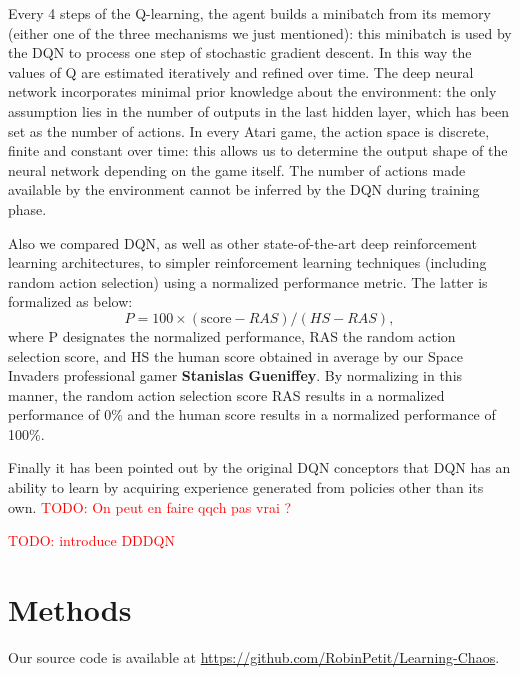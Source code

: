 \documentclass[letterpaper]{article}
\newcommand\todo[1]{\textcolor{red}{TODO: #1}}
\begin{document}
Every 4 steps of the Q-learning, the agent builds a minibatch from its memory (either one of the three mechanisms we just mentioned):
this minibatch is used by the DQN to process one step of stochastic gradient descent. In this way the values of Q are estimated iteratively and
refined over time. The deep neural network incorporates minimal prior knowledge about the environment: the only assumption lies in the number of
outputs in the last hidden layer, which has been set as the number of actions. In every Atari game, the action space is discrete, finite and constant over time:
this allows us to determine the output shape of the neural network depending on the game itself. The number of actions made available by the environment
cannot be inferred by the DQN during training phase.

Also we compared DQN, as well as other state-of-the-art deep reinforcement learning architectures, to simpler reinforcement learning techniques (including
random action selection) using a normalized performance metric. The latter is formalized as below:
\begin{equation}
    P = 100 \times (\text{score} - RAS) / (HS - RAS),
\end{equation}
where P designates the normalized performance, RAS the random action selection score, and HS the human score obtained in average by our
Space Invaders professional gamer \textbf{Stanislas Gueniffey}. By normalizing in this manner, the random action selection score RAS results in
a normalized performance of 0\% and the human score results in a normalized performance of 100\%.

Finally it has been pointed out by the original DQN conceptors that DQN has an ability to learn by acquiring experience generated from policies
other than its own. \todo{On peut en faire qqch pas vrai ?}

\todo{introduce DDDQN}

\section{Methods}

Our source code is available at \url{https://github.com/RobinPetit/Learning-Chaos}.
\end{document}
